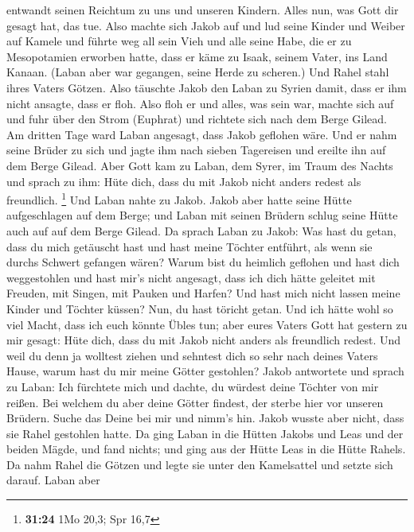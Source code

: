 entwandt seinen Reichtum zu uns und unseren Kindern. Alles nun, was Gott
dir gesagt hat, das tue.  Also machte sich Jakob auf und
lud seine Kinder und Weiber auf Kamele  und führte weg
all sein Vieh und alle seine Habe, die er zu Mesopotamien erworben
hatte, dass er käme zu Isaak, seinem Vater, ins Land Kanaan.
 (Laban aber war gegangen, seine Herde zu scheren.) Und
Rahel stahl ihres Vaters Götzen.  Also täuschte Jakob den
Laban zu Syrien damit, dass er ihm nicht ansagte, dass er floh.
 Also floh er und alles, was sein war, machte sich auf
und fuhr über den Strom (Euphrat) und richtete sich nach dem Berge
Gilead.  Am dritten Tage ward Laban angesagt, dass Jakob
geflohen wäre.  Und er nahm seine Brüder zu sich und
jagte ihm nach sieben Tagereisen und ereilte ihn auf dem Berge Gilead.
 Aber Gott kam zu Laban, dem Syrer, im Traum des Nachts
und sprach zu ihm: Hüte dich, dass du mit Jakob nicht anders redest als
freundlich. \footnote{\textbf{31:24} 1Mo 20,3; Spr 16,7} 
Und Laban nahte zu Jakob. Jakob aber hatte seine Hütte aufgeschlagen auf
dem Berge; und Laban mit seinen Brüdern schlug seine Hütte auch auf auf
dem Berge Gilead.  Da sprach Laban zu Jakob: Was hast du
getan, dass du mich getäuscht hast und hast meine Töchter entführt, als
wenn sie durchs Schwert gefangen wären?  Warum bist du
heimlich geflohen und hast dich weggestohlen und hast mir's nicht
angesagt, dass ich dich hätte geleitet mit Freuden, mit Singen, mit
Pauken und Harfen?  Und hast mich nicht lassen meine
Kinder und Töchter küssen? Nun, du hast töricht getan. 
Und ich hätte wohl so viel Macht, dass ich euch könnte Übles tun; aber
eures Vaters Gott hat gestern zu mir gesagt: Hüte dich, dass du mit
Jakob nicht anders als freundlich redest.  Und weil du
denn ja wolltest ziehen und sehntest dich so sehr nach deines Vaters
Hause, warum hast du mir meine Götter gestohlen?  Jakob
antwortete und sprach zu Laban: Ich fürchtete mich und dachte, du
würdest deine Töchter von mir reißen.  Bei welchem du
aber deine Götter findest, der sterbe hier vor unseren Brüdern. Suche
das Deine bei mir und nimm's hin. Jakob wusste aber nicht, dass sie
Rahel gestohlen hatte.  Da ging Laban in die Hütten
Jakobs und Leas und der beiden Mägde, und fand nichts; und ging aus der
Hütte Leas in die Hütte Rahels.  Da nahm Rahel die Götzen
und legte sie unter den Kamelsattel und setzte sich darauf. Laban aber
